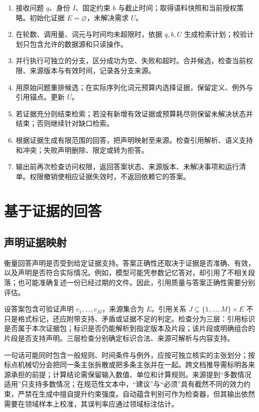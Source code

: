 \documentclass[../textbook.tex]{subfiles}
\begin{document}
\begin{algorithm}[有界证据检索与回答]
\begin{enumerate}
 \item 接收问题 $q$、身份 $I$、固定约束 $b$ 与截止时间；取得语料快照和当前授权策略。初始化证据 $E=\varnothing$，未解决需求 $U$。
 \item 在轮数、调用量、词元与时间均未超限时，依据 $q,b,U$ 生成检索计划；校验计划只包含允许的数据源和只读操作。
 \item 并行执行可独立的分支，区分成功为空、失败和超时。合并候选，检查当前权限、来源版本与有效时间，记录各分支来源。
 \item 用原始问题重排候选；在实际序列化词元预算内选择证据，保留定义、例外与引用锚点。更新 $U$。
 \item 若证据充分则结束检索；若没有新增有效证据或预算耗尽则保留未解决状态并结束；否则继续针对缺口检索。
 \item 根据证据生成有限范围的回答，把声明映射至来源。检查引用解析、语义支持和冲突；失败声明删除、限定或转为拒答。
 \item 输出前再次检查访问权限，返回答案状态、来源版本、未解决事项和运行清单。权限撤销使相应证据失效时，不返回依赖它的答案。
\end{enumerate}
\end{algorithm}

\section{基于证据的回答}

\subsection{声明证据映射}
衡量回答声明是否受到给定证据支持。答案正确性还取决于证据是否准确、有效，以及声明是否符合实际情况。例如，模型可能凭参数记忆答对，却引用了不相关段落；也可能准确复述一份已经过期的文件。因此，引用质量与答案正确性需要分别评估\cite{gao2023citations}。

设答案包含可验证声明 $c_1,\ldots,c_M$，来源集合为 $E$。引用关系 $J\subseteq\{1,\ldots,M\}\times E$ 不只是格式标记，还应附带支持、矛盾或证据不足的判定。检查分为三层：引用标识是否属于本次证据包；标识是否仍能解析到指定版本及片段；该片段或明确组合的片段是否支持声明。三层检查分别确定标识合法、来源可解析与内容支持。

一句话可能同时包含一般规则、时间条件与例外，应按可独立核实的主张划分；按标点机械切分会把同一条主张拆散或把多条主张并在一起。跨文档推导需标明各来源承担的前提；计算结论需保留输入数值、单位和计算规则。来源提到“多数情况适用”只支持多数情况；在规范性文本中，“建议”与“必须”具有截然不同的效力约束，严禁在生成中擅自提升约束强度。自动蕴含判别可作为检查器，但其输出依然需要在领域样本上校准，其误判率应通过领域标注估计。
\end{document}
